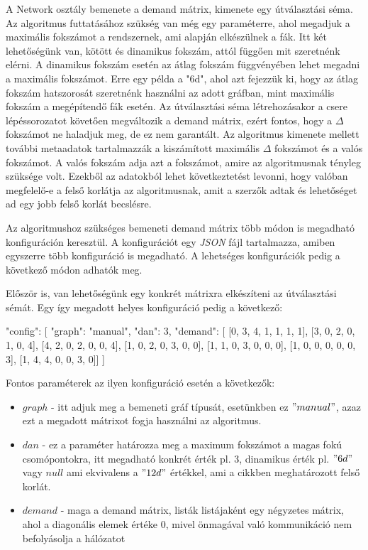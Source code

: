 \documentclass[12pt]{report}
\begin{document}
A Network osztály bemenete a demand mátrix, kimenete egy útválasztási séma.
Az algoritmus futtatásához szükség van még egy paraméterre, ahol megadjuk a maximális fokszámot a rendszernek, ami alapján elkészülnek a fák.
Itt két lehetőségünk van, kötött és dinamikus fokszám, attól függően mit szeretnénk elérni.
A dinamikus fokszám esetén az átlag fokszám függvényében lehet megadni a maximális fokszámot.
Erre egy példa a "6d", ahol azt fejezzük ki, hogy az átlag fokszám hatszorosát szeretnénk használni az adott gráfban, mint maximális fokszám a megépítendő fák esetén.
Az útválasztási séma létrehozásakor a csere lépéssorozatot követően megváltozik a demand mátrix, ezért fontos, hogy a \(\Delta\) fokszámot ne haladjuk meg, de ez nem garantált.
Az algoritmus kimenete mellett további metaadatok tartalmazzák a kiszámított maximális $\Delta$ fokszámot és a valós fokszámot.
A valós fokszám adja azt a fokszámot, amire az algoritmusnak tényleg szüksége volt.  
Ezekből az adatokból lehet következtetést levonni, hogy valóban megfelelő-e a felső korlátja az algoritmusnak, amit a szerzők adtak és lehetőséget ad egy jobb felső korlát becslésre. 


Az algoritmushoz szükséges bemeneti demand mátrix több módon is megadható konfiguráción keresztül.
A konfigurációt egy  \textit{JSON} fájl tartalmazza, amiben egyszerre több konfiguráció is megadható. 
A lehetséges konfigurációk pedig a következő módon adhatók meg.

Először is, van lehetőségünk egy konkrét mátrixra elkészíteni az útválasztási sémát.
Egy így megadott helyes konfiguráció pedig a következő:

\pagebreak

\begin{mintedJson}
	{
		"config": [
		{ 
			"graph": "manual",
			"dan": 3,
			"demand": [
			[0, 3, 4, 1, 1, 1, 1],
			[3, 0, 2, 0, 1, 0, 4],
			[4, 2, 0, 2, 0, 0, 4],
			[1, 0, 2, 0, 3, 0, 0],
			[1, 1, 0, 3, 0, 0, 0],
			[1, 0, 0, 0, 0, 0, 3],
			[1, 4, 4, 0, 0, 3, 0]]	
		} ]
	}
\end{mintedJson}

Fontos paraméterek az ilyen konfiguráció esetén a következők:
\begin{itemize}
	\item $graph$ - itt adjuk meg a bemeneti gráf típusát, esetünkben ez $"manual"$, azaz ezt a megadott mátrixot fogja használni az algoritmus.
	\item $dan$ - ez a paraméter határozza meg a maximum fokszámot a magas fokú csomópontokra, itt megadható konkrét érték pl. 3, dinamikus érték pl. $"6d"$ vagy $null$ ami ekvivalens a $"12d"$ értékkel, ami a cikkben \cite{avin_demand-aware_nodate} meghatározott felső korlát.
	\item $demand$ - maga a demand mátrix, listák listájaként egy négyzetes mátrix, ahol a diagonális elemek értéke $0$, mivel önmagával való kommunikáció nem befolyásolja a hálózatot
\end{itemize}
\end{document}
